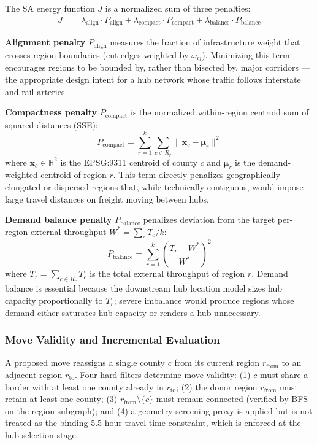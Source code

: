 The SA energy function $J$ is a normalized sum of three penalties:
\begin{align}
  J &= \lambda_{\text{align}} \cdot P_{\text{align}}
      + \lambda_{\text{compact}} \cdot P_{\text{compact}}
      + \lambda_{\text{balance}} \cdot P_{\text{balance}}
\end{align}

\textbf{Alignment penalty} $P_{\text{align}}$ measures the fraction of infrastructure
weight that crosses region boundaries (cut edges weighted by $\omega_{ij}$). Minimizing
this term encourages regions to be bounded by, rather than bisected by, major corridors ---
the appropriate design intent for a hub network whose traffic follows interstate and rail
arteries.

\textbf{Compactness penalty} $P_{\text{compact}}$ is the normalized within-region centroid
sum of squared distances (SSE):
\begin{equation}
  P_{\text{compact}} = \sum_{r=1}^{k} \sum_{c \in R_r}
    \bigl\| \mathbf{x}_c - \boldsymbol{\mu}_r \bigr\|^2
\end{equation}
where $\mathbf{x}_c \in \mathbb{R}^2$ is the EPSG:9311 centroid of county $c$ and
$\boldsymbol{\mu}_r$ is the demand-weighted centroid of region $r$. This term directly
penalizes geographically elongated or dispersed regions that, while technically contiguous,
would impose large travel distances on freight moving between hubs.

\textbf{Demand balance penalty} $P_{\text{balance}}$ penalizes deviation from the target
per-region external throughput $W^* = \sum_c T_c / k$:
\begin{equation}
  P_{\text{balance}} = \sum_{r=1}^{k} \left( \frac{T_r - W^*}{W^*} \right)^2
\end{equation}
where $T_r = \sum_{c \in R_r} T_c$ is the total external throughput of region $r$.
Demand balance is essential because the downstream hub location model sizes hub capacity
proportionally to $T_r$; severe imbalance would produce regions whose demand either
saturates hub capacity or renders a hub unnecessary.

\subsubsection{Move Validity and Incremental Evaluation}

A proposed move reassigns a single county $c$ from its current region $r_{\text{from}}$ to
an adjacent region $r_{\text{to}}$. Four hard filters determine move validity: (1) $c$ must
share a border with at least one county already in $r_{\text{to}}$; (2) the donor region
$r_{\text{from}}$ must retain at least one county; (3) $r_{\text{from}} \setminus \{c\}$
must remain connected (verified by BFS on the region subgraph); and (4) a geometry screening
proxy is applied but is not treated as the binding 5.5-hour travel time constraint, which is
enforced at the hub-selection stage.

